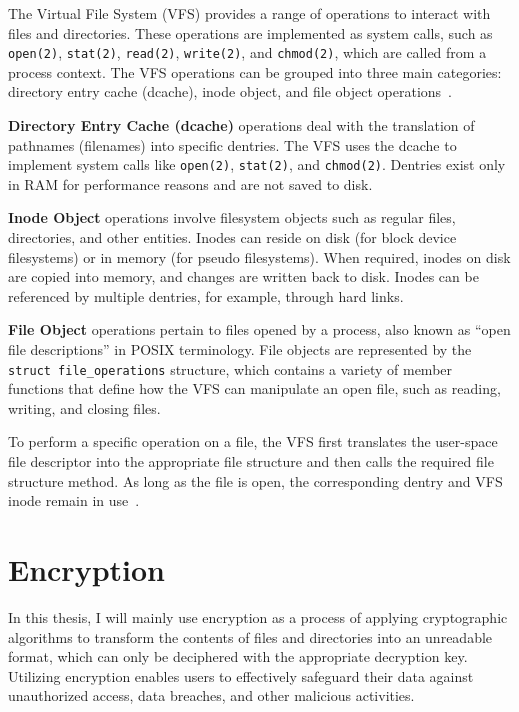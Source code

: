 The Virtual File System (VFS) provides a range of operations to interact with files and directories.
These operations are implemented as system calls, such as \texttt{open(2)}, \texttt{stat(2)}, \texttt{read(2)}, \texttt{write(2)}, and \texttt{chmod(2)}, which are called from a process context.
The VFS operations can be grouped into three main categories: directory entry cache (dcache), inode object, and file object operations~\cite{vfs}.

\textbf{Directory Entry Cache (dcache)} operations deal with the translation of pathnames (filenames) into specific dentries.
The VFS uses the dcache to implement system calls like \texttt{open(2)}, \texttt{stat(2)}, and \texttt{chmod(2)}.
Dentries exist only in RAM for performance reasons and are not saved to disk.

\textbf{Inode Object} operations involve filesystem objects such as regular files, directories, and other entities.
Inodes can reside on disk (for block device filesystems) or in memory (for pseudo filesystems).
When required, inodes on disk are copied into memory, and changes are written back to disk.
Inodes can be referenced by multiple dentries, for example, through hard links.

\textbf{File Object} operations pertain to files opened by a process, also known as ``open file descriptions'' in POSIX terminology.
File objects are represented by the \texttt{struct file\_operations} structure, which contains a variety of member functions that define how the VFS can manipulate an open file, such as reading, writing, and closing files.

To perform a specific operation on a file, the VFS first translates the user-space file descriptor into the appropriate file structure and then calls the required file structure method.
As long as the file is open, the corresponding dentry and VFS inode remain in use~\cite{vfs}.


\section{Encryption}\label{sec:encryption-approaches}

In this thesis, I will mainly use encryption as a process of applying cryptographic algorithms to transform the contents of files and directories into an unreadable format, which can only be deciphered with the appropriate decryption key.
Utilizing encryption enables users to effectively safeguard their data against unauthorized access, data breaches, and other malicious activities.

